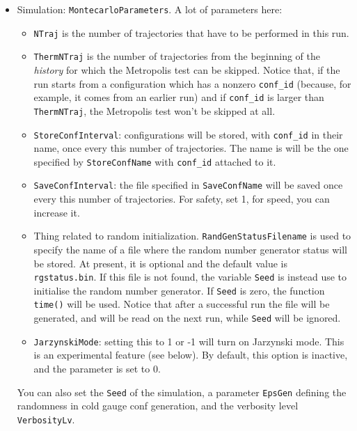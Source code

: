 \begin{itemize}
\item{Simulation: \verb|MontecarloParameters|.} A lot of parameters here: 
\begin{itemize}
\item \verb|NTraj| is the number of trajectories that have to be performed in 
    this run.
\item \verb|ThermNTraj| is the number of trajectories from the beginning of the 
    \emph{history} for which the Metropolis test can be skipped. Notice that, 
if 
    the run starts from a configuration which has a nonzero \verb|conf_id| 
    (because, for example, it comes from an earlier run) and if \verb|conf_id| 
is 
    larger than \verb|ThermNTraj|, the Metropolis test won't be skipped at all.
\item \verb|StoreConfInterval|: configurations will be stored, with 
    \verb|conf_id| in their name, once every this number of trajectories. The 
name 
    is will be the one specified by \verb|StoreConfName| with \verb|conf_id| 
    attached to it. 
\item \verb|SaveConfInterval|: the file specified in \verb|SaveConfName| will 
    be saved once every this number of trajectories. For safety, set 1, for 
speed, 
    you can increase it.

\item Thing related to random initialization. \verb|RandGenStatusFilename| is 
used to specify the name of a file where the random number generator status 
will be stored. At present, it is optional and the default value is 
\verb|rgstatus.bin|. If this file is not found, the variable \verb|Seed| is 
instead use to initialise the random number generator. If \verb|Seed| is zero, 
the function \verb|time()| will be used. Notice that after a successful run 
the file will be generated, and will be read on the next run, while \verb|Seed| 
will be ignored.
\item \verb|JarzynskiMode|: setting this to 1 or -1 will turn on Jarzynski 
mode. This is an experimental feature (see below). By default, this option is 
inactive, and the parameter is set to 0.
\end{itemize}
You can also set the \verb|Seed| of the simulation, 
a parameter 
\verb|EpsGen| defining the randomness in cold gauge conf generation, and the 
verbosity level \verb|VerbosityLv|. 



\end{itemize}
